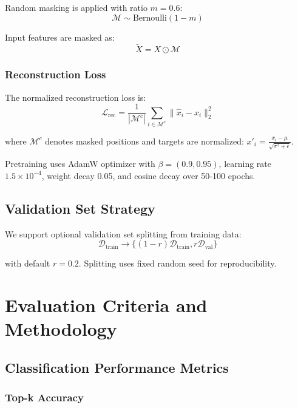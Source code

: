 Random masking is applied with ratio $m = 0.6$:
\begin{equation}
\mathcal{M} \sim \text{Bernoulli}(1-m)
\end{equation}

Input features are masked as:
\begin{equation}
\tilde{X} = X \odot \mathcal{M}
\end{equation}

\subsubsection{Reconstruction Loss}

The normalized reconstruction loss is:
\begin{equation}
\mathcal{L}_{\text{rec}} = \frac{1}{|\mathcal{M}^c|} \sum_{i \in \mathcal{M}^c} \|\hat{x}_i - x_i\|_2^2
\end{equation}

where $\mathcal{M}^c$ denotes masked positions and targets are normalized: $x'_i = \frac{x_i - \mu}{\sqrt{\sigma^2 + \epsilon}}$.

Pretraining uses AdamW optimizer with $\beta = (0.9, 0.95)$, learning rate $1.5 \times 10^{-4}$, weight decay 0.05, and cosine decay over 50-100 epochs.

\subsection{Validation Set Strategy}

We support optional validation set splitting from training data:
\begin{equation}
\mathcal{D}_{\text{train}} \rightarrow \{(1-r)\mathcal{D}_{\text{train}}, r\mathcal{D}_{\text{val}}\}
\end{equation}

with default $r = 0.2$. Splitting uses fixed random seed for reproducibility.

\section{Evaluation Criteria and Methodology}

\subsection{Classification Performance Metrics}

\subsubsection{Top-k Accuracy}

